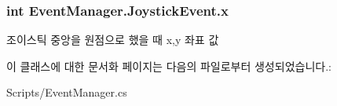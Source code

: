 \subsubsection[{x}]{\setlength{\rightskip}{0pt plus 5cm}int Event\+Manager.\+Joystick\+Event.\+x}\label{class_event_manager_1_1_joystick_event_a46fa188ab73a143068f0db144189258c}
조이스틱 중앙을 원점으로 했을 때 x,y 좌표 값 

이 클래스에 대한 문서화 페이지는 다음의 파일로부터 생성되었습니다.\+:\begin{DoxyCompactItemize}
\item 
Scripts/Event\+Manager.\+cs\end{DoxyCompactItemize}
